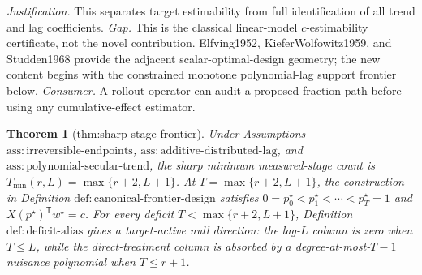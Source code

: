 \documentclass{article}
\newtheorem{theorem}{Theorem}
\begin{document}
\par\smallskip\noindent \textit{Justification.} This separates target estimability from full identification of all trend and lag coefficients. \textit{Gap.} This is the classical linear-model \(c\)-estimability certificate, not the novel contribution. Elfving1952, KieferWolfowitz1959, and Studden1968 provide the adjacent scalar-optimal-design geometry; the new content begins with the constrained monotone polynomial-lag support frontier below. \textit{Consumer.} A rollout operator can audit a proposed fraction path before using any cumulative-effect estimator.

\begin{theorem}[thm:sharp-stage-frontier]\label{thm:sharp-stage-frontier}
Under Assumptions \(\mathrm{ass:irreversible\text{-}endpoints}\), \(\mathrm{ass:additive\text{-}distributed\text{-}lag}\), and \(\mathrm{ass:polynomial\text{-}secular\text{-}trend}\), the sharp minimum measured-stage count is \(T_{\min}(r,L)=\max\{r+2,L+1\}\). At \(T=\max\{r+2,L+1\}\), the construction in Definition \(\mathrm{def:canonical\text{-}frontier\text{-}design}\) satisfies \(0=p_0^\star<p_1^\star<\cdots<p_T^\star=1\) and \(X(p^\star)^{\mathsf T}w^\star=c\). For every deficit \(T<\max\{r+2,L+1\}\), Definition \(\mathrm{def:deficit\text{-}alias}\) gives a target-active null direction: the lag-\(L\) column is zero when \(T\le L\), while the direct-treatment column is absorbed by a degree-at-most-\(T-1\) nuisance polynomial when \(T\le r+1\).
\end{theorem}
\end{document}
